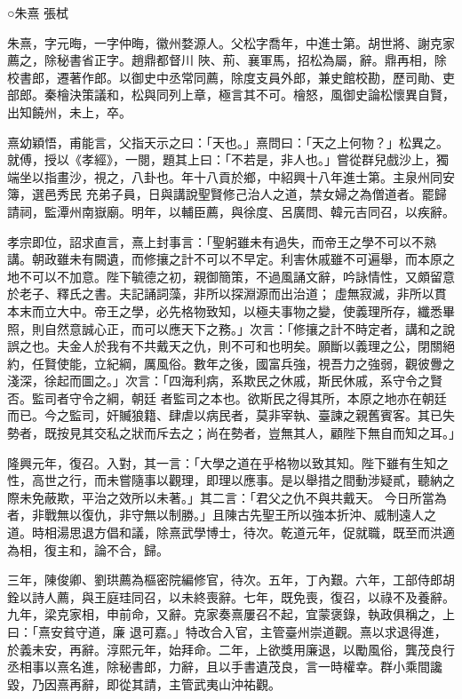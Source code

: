 
\begin{pinyinscope}

 ○朱熹
 張栻



 朱熹，字元晦，一字仲晦，徽州婺源人。父松字喬年，中進士第。胡世將、謝克家薦之，除秘書省正字。趙鼎都督川
 陜、荊、襄軍馬，招松為屬，辭。鼎再相，除校書郎，遷著作郎。以御史中丞常同薦，除度支員外郎，兼史館校勘，歷司勛、吏部郎。秦檜決策議和，松與同列上章，極言其不可。檜怒，風御史論松懷異自賢，出知饒州，未上，卒。



 熹幼穎悟，甫能言，父指天示之曰：「天也。」熹問曰：「天之上何物？」松異之。就傅，授以《孝經》，一閱，題其上曰：「不若是，非人也。」嘗從群兒戲沙上，獨端坐以指畫沙，視之，八卦也。年十八貢於鄉，中紹興十八年進士第。主泉州同安簿，選邑秀民
 充弟子員，日與講說聖賢修己治人之道，禁女婦之為僧道者。罷歸請祠，監潭州南嶽廟。明年，以輔臣薦，與徐度、呂廣問、韓元吉同召，以疾辭。



 孝宗即位，詔求直言，熹上封事言：「聖躬雖未有過失，而帝王之學不可以不熟講。朝政雖未有闕遺，而修攘之計不可以不早定。利害休戚雖不可遍舉，而本原之地不可以不加意。陛下毓德之初，親御簡策，不過風誦文辭，吟詠情性，又頗留意於老子、釋氏之書。夫記誦詞藻，非所以探淵源而出治道；
 虛無寂滅，非所以貫本末而立大中。帝王之學，必先格物致知，以極夫事物之變，使義理所存，纖悉畢照，則自然意誠心正，而可以應天下之務。」次言：「修攘之計不時定者，講和之說誤之也。夫金人於我有不共戴天之仇，則不可和也明矣。願斷以義理之公，閉關絕約，任賢使能，立紀綱，厲風俗。數年之後，國富兵強，視吾力之強弱，觀彼釁之淺深，徐起而圖之。」次言：「四海利病，系欺民之休戚，斯民休戚，系守令之賢否。監司者守令之綱，朝廷
 者監司之本也。欲斯民之得其所，本原之地亦在朝廷而已。今之監司，奸贓狼籍、肆虐以病民者，莫非宰執、臺諫之親舊賓客。其已失勢者，既按見其交私之狀而斥去之；尚在勢者，豈無其人，顧陛下無自而知之耳。」



 隆興元年，復召。入對，其一言：「大學之道在乎格物以致其知。陛下雖有生知之性，高世之行，而未嘗隨事以觀理，即理以應事。是以舉措之間動涉疑貳，聽納之際未免蔽欺，平治之效所以未著。」其二言：「君父之仇不與共戴天。
 今日所當為者，非戰無以復仇，非守無以制勝。」且陳古先聖王所以強本折沖、威制遠人之道。時相湯思退方倡和議，除熹武學博士，待次。乾道元年，促就職，既至而洪適為相，復主和，論不合，歸。



 三年，陳俊卿、劉珙薦為樞密院編修官，待次。五年，丁內艱。六年，工部侍郎胡銓以詩人薦，與王庭珪同召，以未終喪辭。七年，既免喪，復召，以祿不及養辭。九年，梁克家相，申前命，又辭。克家奏熹屢召不起，宜蒙褒錄，執政俱稱之，上曰：「熹安貧守道，廉
 退可嘉。」特改合入官，主管臺州崇道觀。熹以求退得進，於義未安，再辭。淳熙元年，始拜命。二年，上欲獎用廉退，以勵風俗，龔茂良行丞相事以熹名進，除秘書郎，力辭，且以手書遺茂良，言一時權幸。群小乘間讒毀，乃因熹再辭，即從其請，主管武夷山沖祐觀。




\end{pinyinscope}
